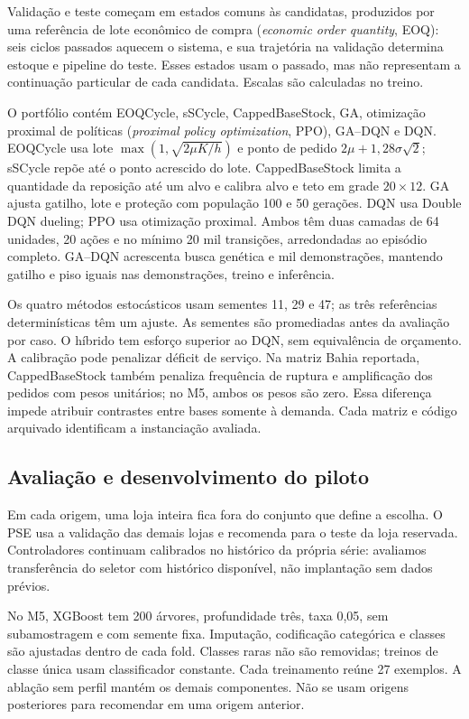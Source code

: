 \documentclass[preprint,12pt]{elsarticle}
\begin{document}
Validação e teste começam em estados comuns às candidatas, produzidos por uma referência de lote econômico de compra (\textit{economic order quantity}, EOQ): seis ciclos passados aquecem o sistema, e sua trajetória na validação determina estoque e pipeline do teste. Esses estados usam o passado, mas não representam a continuação particular de cada candidata. Escalas são calculadas no treino.

O portfólio contém EOQCycle, sSCycle, CappedBaseStock, GA, otimização proximal de políticas (\textit{proximal policy optimization}, PPO), GA--DQN e DQN. EOQCycle usa lote $\max(1,\sqrt{2\mu K/h})$ e ponto de pedido $2\mu+1{,}28\sigma\sqrt2$; sSCycle repõe até o ponto acrescido do lote. CappedBaseStock limita a quantidade da reposição até um alvo e calibra alvo e teto em grade $20\times12$. GA ajusta gatilho, lote e proteção com população 100 e 50 gerações. DQN usa Double DQN dueling; PPO usa otimização proximal. Ambos têm duas camadas de 64 unidades, 20 ações e no mínimo 20 mil transições, arredondadas ao episódio completo. GA--DQN acrescenta busca genética e mil demonstrações, mantendo gatilho e piso iguais nas demonstrações, treino e inferência.

Os quatro métodos estocásticos usam sementes 11, 29 e 47; as três referências determinísticas têm um ajuste. As sementes são promediadas antes da avaliação por caso. O híbrido tem esforço superior ao DQN, sem equivalência de orçamento. A calibração pode penalizar déficit de serviço. Na matriz Bahia reportada, CappedBaseStock também penaliza frequência de ruptura e amplificação dos pedidos com pesos unitários; no M5, ambos os pesos são zero. Essa diferença impede atribuir contrastes entre bases somente à demanda. Cada matriz e código arquivado identificam a instanciação avaliada.

\subsection{Avaliação e desenvolvimento do piloto}
Em cada origem, uma loja inteira fica fora do conjunto que define a escolha. O PSE usa a validação das demais lojas e recomenda para o teste da loja reservada. Controladores continuam calibrados no histórico da própria série: avaliamos transferência do seletor com histórico disponível, não implantação sem dados prévios.

No M5, XGBoost tem 200 árvores, profundidade três, taxa 0,05, sem subamostragem e com semente fixa. Imputação, codificação categórica e classes são ajustadas dentro de cada fold. Classes raras não são removidas; treinos de classe única usam classificador constante. Cada treinamento reúne 27 exemplos. A ablação sem perfil mantém os demais componentes. Não se usam origens posteriores para recomendar em uma origem anterior.
\end{document}
